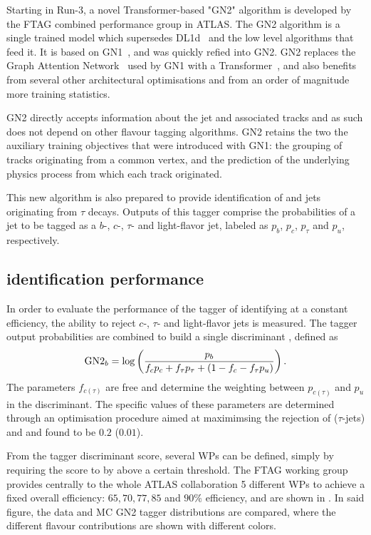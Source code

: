 Starting in Run-3, a novel Transformer-based "GN2" algorithm is developed by the \ac{FTAG} combined performance group in \ac{ATLAS}. The GN2 algorithm is a single trained model which supersedes DL1d~\cite{ATLASFTAGRun2DL1} and the low level algorithms that feed it. It is based on GN1~\cite{ATLASFTAGGN1}, and was quickly refied into GN2. GN2 replaces the Graph Attention Network~\cite{GANs} used by GN1 with a Transformer~\cite{GN2Transformer}, and also benefits from several other architectural optimisations and from an order of magnitude more training statistics.

GN2 directly accepts information about the jet and associated tracks and as such does not depend on other flavour tagging algorithms. GN2 retains the two the auxiliary training objectives that were introduced with GN1: the grouping of tracks originating from a common vertex, and the prediction of the underlying physics process from which each track originated.

This new algorithm is also prepared to provide identification of \cjets and jets originating from \(\tau\) decays. Outputs of this tagger comprise the probabilities of a jet to be tagged as a \(b\)-, \(c\)-, \(\tau\)- and light-flavor jet, labeled as \(p_b\), \(p_c\), \(p_{\tau}\) and \(p_u\), respectively.

\subsection{\bjet identification performance}

In order to evaluate the performance of the tagger of identifying \bjets at a constant efficiency, the ability to reject \(c\)-, \(\tau\)- and light-flavor jets is measured. The tagger output probabilities are combined to build a single discriminant \gntb, defined as
\begin{equation}
    \text{GN2}_{b} = \log \left(
        \frac{p_b}{f_c p_c + f_{\tau} p_{\tau} + \left(1-f_c-f_{\tau}p_u\right)}
    \right).
\end{equation}
The parameters \(f_{c(\tau)}\) are free and determine the weighting between \(p_{c(\tau)}\) and \(p_u\) in the discriminant. The specific values of these parameters are determined through an optimisation procedure aimed at maximimsing the rejection of \cjets (\(\tau\)-jets) and \ljets and found to be \(0.2\) (\(0.01\)).


From the tagger discriminant score, several \acp{WP} can be defined, simply by requiring the \gntb score to by above a certain threshold. The \ac{FTAG} working group provides centrally to the whole \ac{ATLAS} collaboration 5 different \acp{WP} to achieve a fixed overall \btagging efficiency: \(65, 70, 77, 85\) and \(90\%\) efficiency, and are shown in \Fig{\ref{fig:objects:jet_tagging:btag_discrminant}}. In said figure, the data and \ac{MC} GN2 tagger distributions are compared, where the different flavour contributions are shown with different colors.

